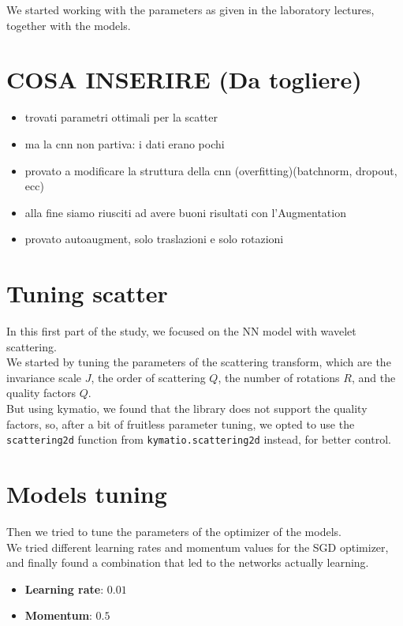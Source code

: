 \documentclass{report}
\begin{document}
We started working with the parameters as given in the laboratory lectures, together with the models.

\section{COSA INSERIRE (Da togliere)}
\begin{itemize}
  \item trovati parametri ottimali per la scatter
  \item ma la cnn non partiva: i dati erano pochi
  \item provato a modificare la struttura della cnn (overfitting)(batchnorm, dropout, ecc)
  \item alla fine siamo riusciti ad avere buoni risultati con l'Augmentation
  \item provato autoaugment, solo traslazioni e solo rotazioni
\end{itemize}

\section{Tuning scatter}
In this first part of the study, we focused on the NN model with wavelet scattering. \\
We started by tuning the parameters of the scattering transform, which are the invariance scale $J$, the order of scattering $Q$, the number of rotations $R$, and the quality factors $Q$. \\

But using kymatio, we found that the library does not support the quality factors, so, after a bit of fruitless parameter tuning, 
we opted to use the \texttt{scattering2d} function from \texttt{kymatio.scattering2d} instead, for better control. \\

\section{Models tuning}
Then we tried to tune the parameters of the optimizer of the models.\\
We tried different learning rates and momentum values for the SGD optimizer, and finally found a combination that led to the networks actually learning.
\begin{itemize}
  \item \textbf{Learning rate}: $0.01$ 
  \item \textbf{Momentum}: $0.5$
\end{itemize}
\end{document}
